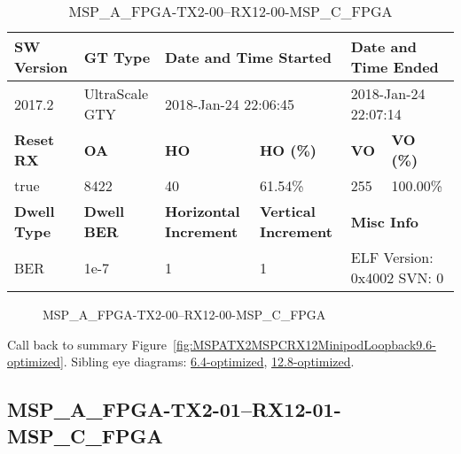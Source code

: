 \begin{table}[h]
\centering
\caption{MSP\_A\_FPGA-TX2-00--RX12-00-MSP\_C\_FPGA}
\label{tab:MSPAFPGATX200RX1200MSPCFPGA9.6-optimized}
\begin{tabular}{@{}|l|l|l|l|l|l|@{}}
\toprule
\textbf{SW Version}                & \textbf{GT Type}   & \multicolumn{2}{l|}{\textbf{Date and Time Started}}            & \multicolumn{2}{l|}{\textbf{Date and Time Ended}}        \\ \midrule
2017.2                       & UltraScale GTY          & \multicolumn{2}{l|}{2018-Jan-24 22:06:45}                   & \multicolumn{2}{l|}{2018-Jan-24 22:07:14}               \\ \midrule
\textbf{Reset RX}                  & \textbf{OA} & \textbf{HO}   & \textbf{HO (\%)} & \textbf{VO} & \textbf{VO (\%)} \\ \midrule
true & 8422        & 40          & 61.54\%        & 255        & 100.00\%       \\ \midrule
\textbf{Dwell Type}                & \textbf{Dwell BER} & \textbf{Horizontal Increment} & \textbf{Vertical Increment}    & \multicolumn{2}{l|}{\textbf{Misc Info}}                  \\ \midrule
BER                            & 1e-7        & 1        & 1           & \multicolumn{2}{l|}{ELF Version: 0x4002 SVN: 0}                         \\ \bottomrule
\end{tabular}
\end{table}

\begin{figure}[h]
\caption{MSP\_A\_FPGA-TX2-00--RX12-00-MSP\_C\_FPGA} \label{fig:MSPAFPGATX200RX1200MSPCFPGA9.6-optimized}
\end{figure}

Call back to summary Figure~\ref{fig:MSPATX2MSPCRX12MinipodLoopback9.6-optimized}.
Sibling eye diagrams: \hyperref[sec:MSPAFPGATX200RX1200MSPCFPGA6.4-optimized]{6.4-optimized}, \hyperref[sec:MSPAFPGATX200RX1200MSPCFPGA12.8-optimized]{12.8-optimized}.

\clearpage
\newpage


\subsection{MSP\_A\_FPGA-TX2-01--RX12-01-MSP\_C\_FPGA}\label{sec:MSPAFPGATX201RX1201MSPCFPGA9.6-optimized}


